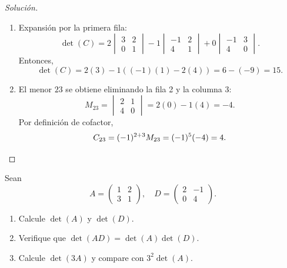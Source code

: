 \documentclass[a4,11pt]{aleph-notas}
\begin{document}
\begin{proof}[Solución]\hspace{0pt}
    \begin{enumerate}
    \item
        Expansión por la primera fila:
        \[
            \det(C)=2\begin{vmatrix}3 & 2 \\ 0 & 1\end{vmatrix}-1\begin{vmatrix}-1 & 2 \\ 4 & 1\end{vmatrix}+0\begin{vmatrix}-1 & 3 \\ 4 & 0\end{vmatrix}.
        \]
        Entonces,
        \[
            \det(C)=2(3)-1((-1)(1)-2(4))=6-(-9)=15.
        \]
    \item
        El menor $23$ se obtiene eliminando la fila 2 y la columna 3:
        \[
            M_{23}=\begin{vmatrix}2 & 1 \\ 4 & 0\end{vmatrix}=2(0)-1(4)=-4.
        \]
        Por definición de cofactor,
        \[
            C_{23}=(-1)^{2+3}M_{23}=(-1)^5(-4)=4.\qedhere
        \]
    \end{enumerate}
\end{proof}

\begin{ejer}
    Sean
    \[
        A=
        \begin{pmatrix}
            1 & 2 \\
            3 & 1
        \end{pmatrix},
        \quad
        D=
        \begin{pmatrix}
            2 & -1 \\
            0 & 4
        \end{pmatrix}.
    \]
    
    \begin{enumerate}
    \item
        Calcule $\det(A)$ y $\det(D)$.
    \item
        Verifique que $\det(AD)=\det(A)\det(D)$.
    \item
        Calcule $\det(3A)$ y compare con $3^2\det(A)$.
    \end{enumerate}
\end{ejer}
\end{document}
